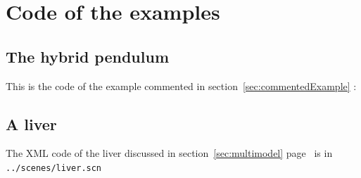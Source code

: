 \section{Code of the examples}
\subsection{The hybrid pendulum}\label{cpp:hybrid}
This is the code of the example commented in section~\ref{sec:commentedExample} :

\subsection{A liver}\label{xml:liver}
The XML code of the liver discussed in section~\ref{sec:multimodel} page~\pageref{bla:liver} is in \texttt{../scenes/liver.scn}

% 
%
% 
%
% 
%
% 
